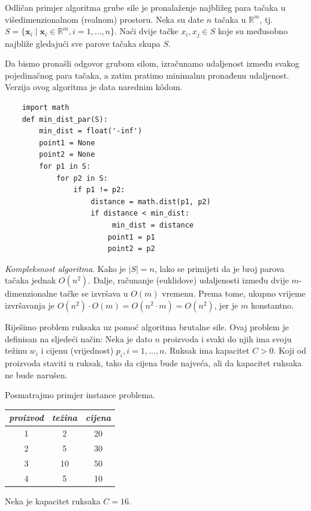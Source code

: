 \begin{example}
	Odličan primjer algoritma grube sile je pronalaženje najbližeg para tačaka u višedimenzionalnom (realnom) prostoru. Neka su date $n$ tačaka u $\mathbb{R}^m$, tj. $S=\{ \textbf{x}_i \mid \textbf{x}_i \in  \mathbb{R}^m, i=1, \ldots, n\}$. Naći dvije tačke $x_i, x_j \in S$ koje su međusobno najbliže gledajući sve parove tačaka skupa $S$.
\end{example}
\begin{solution}
    Da bismo pronašli odgovor grubom silom,  izračunamo udaljenost između svakog pojedinačnog para tačaka, a zatim pratimo minimalnu pronađenu udaljenost. Verzija ovog algoritma je data narednim k\^odom.
   
\footnotesize{
\begin{verbatim}
	import math 
	def min_dist_par(S):
		min_dist = float('-inf')
		point1 = None	
		point2 = None
		for p1 in S:
			for p2 in S:
				if p1 != p2:
					distance = math.dist(p1, p2)
					if distance < min_dist:
					     min_dist = distance
    			 		point1 = p1
    			 		point2 = p2
\end{verbatim}}
\end{solution}

\textit{Kompleksnost algoritma}. Kako je $|S| = n$, lako se primijeti da je broj parova tačaka jednak $O(n^2)$. Dalje, računanje (euklidove) udaljenosti između dvije $m$-dimenzionalne tačke se izvršava u $O(m)$ vremenu. Prema tome, ukupno vrijeme izvršavanja je $O(n^2)\cdot O(m) = O(n^2\cdot m) = O(n^2)$, jer je $m$ konstantno.

\begin{example}
	Riješimo problem ruksaka uz pomoć algoritma brutalne sile. Ovaj problem je definisan na sljedeći način: Neka je dato $n$ proizvoda i svaki do njih ima svoju težinu $w_i$ i cijenu (vrijednost) $p_i, i=1,\ldots, n$. Ruksak ima kapacitet $C>0$. Koji od proizvoda staviti u ruksak, tako da cijena bude najveća, ali da   kapacitet ruksaka ne bude narušen. 
\end{example}

\begin{solution}
	Posmatrajmo primjer instance problema.
\begin{center}	
	\begin{tabular}{ccc}
		\emph{proizvod} & \emph{težina} & \emph{cijena} \\ \hline
		1        &  2	& 20 \\
		2		& 	5	& 30 \\
		3		& 10	& 50 \\
		4		&  5 	& 10 \\ \hline
	\end{tabular}
\end{center}
Neka je kapacitet ruksaka $C=16$.


\end{solution}

